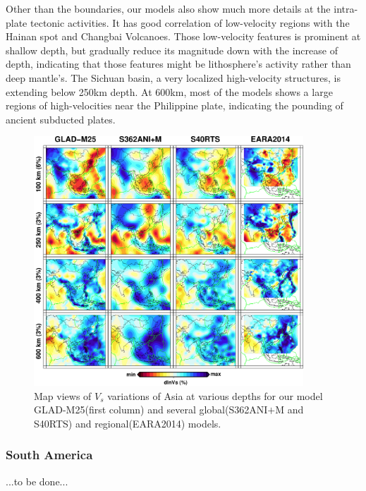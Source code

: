 \documentclass[extra,mreferee]{gji}
\begin{document}
Other than the boundaries, our models also show much more details at the
intra-plate tectonic activities. It has good correlation of low-velocity regions with
the Hainan spot and Changbai Volcanoes. Those low-velocity features is prominent at
shallow depth, but gradually reduce its magnitude down with the increase of
depth, indicating that those features might be lithosphere's activity rather
than deep mantle's.
The Sichuan basin, a very localized high-velocity structures, is extending below
250km depth. At 600km, most of the models shows a large regions of high-velocities
near the Philippine plate, indicating the pounding of ancient subducted plates.

\begin{figure}
\includegraphics[width=0.9\textwidth]{figures/depth_slice/asia_vs.pdf}
  \caption{Map views of $V_s$ variations of Asia at various depths for our model GLAD-M25(first column) and several global(S362ANI$+$M and S40RTS) and regional(EARA2014\citep{chen2015multiparameter}) models.}
\label{fig:asia-vs}
\centering
\end{figure}

\subsubsection{South America}
...to be done...
\end{document}
